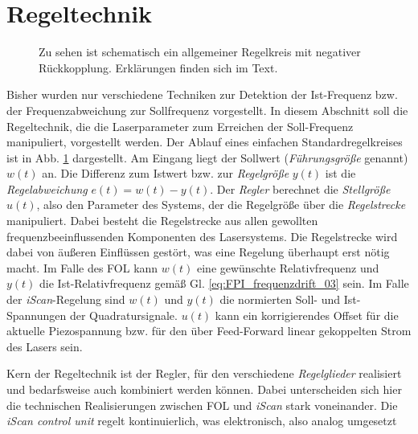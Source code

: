 \section{Regeltechnik}\label{sec:regeltechnik}
\begin{figure}[h]
 	\centering
	\caption[Regelkreis]{Zu sehen ist schematisch ein allgemeiner Regelkreis mit
	negativer Rückkopplung. Erklärungen finden sich im
	Text.}\label{fig:regelkreis}
\end{figure}
Bisher wurden nur verschiedene Techniken zur Detektion der
Ist-Frequenz bzw. der Frequenzabweichung zur Sollfrequenz vorgestellt.
In diesem Abschnitt soll die Regeltechnik, die die Laserparameter zum Erreichen
der Soll-Frequenz manipuliert, vorgestellt werden. Der Ablauf eines
einfachen Standardregelkreises ist in Abb. \ref{fig:regelkreis} dargestellt. Am
Eingang liegt der Sollwert (\textit{Führungsgröße} genannt) $w(t)$ an. Die
Differenz zum Istwert bzw. zur \textit{Regelgröße} $y(t)$ ist die
\textit{Regelabweichung} $e(t)=w(t)-y(t)$. Der \textit{Regler} berechnet die
\textit{Stellgröße} $u(t)$, also den Parameter des Systems, der die Regelgröße
über die \textit{Regelstrecke} manipuliert. Dabei besteht die Regelstrecke aus
allen gewollten frequenzbeeinflussenden Komponenten des Lasersystems. Die
Regelstrecke wird dabei von äußeren Einflüssen gestört, was eine Regelung
überhaupt erst nötig macht. Im Falle des FOL kann $w(t)$ eine
gewünschte Relativfrequenz und $y(t)$ die Ist-Relativfrequenz gemäß Gl.
\eqref{eq:FPI_frequenzdrift_03} sein. Im Falle der \textit{iScan}-Regelung sind
$w(t)$ und $y(t)$ die normierten Soll- und Ist-Spannungen der Quadratursignale. $u(t)$
kann ein korrigierendes Offset für die aktuelle Piezospannung bzw. für den über
Feed-Forward linear gekoppelten Strom des Lasers sein.\par
Kern der Regeltechnik ist der Regler, für den verschiedene \textit{Regelglieder}
realisiert und bedarfsweise auch kombiniert werden können.
Dabei unterscheiden sich hier die technischen Realisierungen zwischen
FOL und \textit{iScan} stark voneinander. Die \textit{iScan
control unit} regelt kontinuierlich, was elektronisch, also analog umgesetzt
